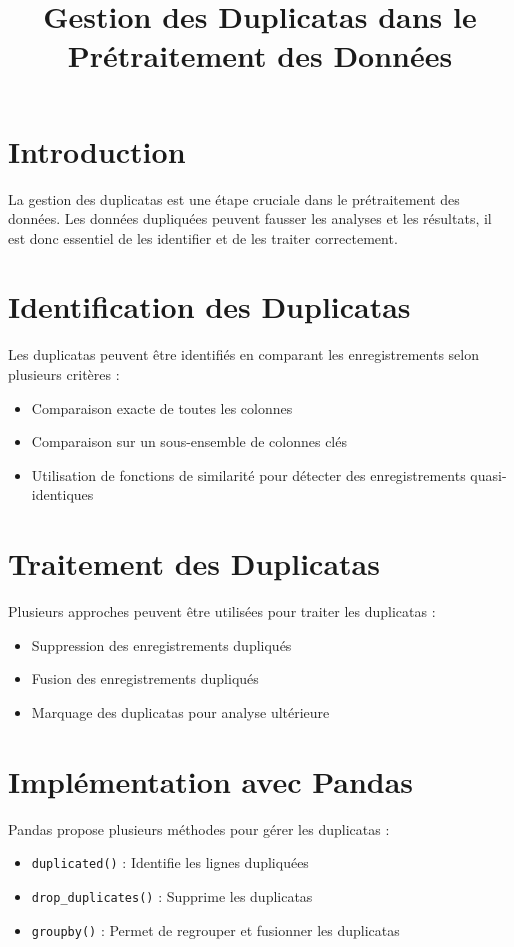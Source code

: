 \documentclass{article}
\title{Gestion des Duplicatas dans le Prétraitement des Données}
\author{}
\date{}
\begin{document}
\maketitle

\section{Introduction}
La gestion des duplicatas est une étape cruciale dans le prétraitement des données. Les données dupliquées peuvent fausser les analyses et les résultats, il est donc essentiel de les identifier et de les traiter correctement.

\section{Identification des Duplicatas}
Les duplicatas peuvent être identifiés en comparant les enregistrements selon plusieurs critères :
\begin{itemize}
    \item Comparaison exacte de toutes les colonnes
    \item Comparaison sur un sous-ensemble de colonnes clés
    \item Utilisation de fonctions de similarité pour détecter des enregistrements quasi-identiques
\end{itemize}

\section{Traitement des Duplicatas}
Plusieurs approches peuvent être utilisées pour traiter les duplicatas :
\begin{itemize}
    \item Suppression des enregistrements dupliqués
    \item Fusion des enregistrements dupliqués
    \item Marquage des duplicatas pour analyse ultérieure
\end{itemize}

\section{Implémentation avec Pandas}
Pandas propose plusieurs méthodes pour gérer les duplicatas \cite{pandas_duplicates,pandas_drop_duplicates} :
\begin{itemize}
    \item \texttt{duplicated()} : Identifie les lignes dupliquées
    \item \texttt{drop\_duplicates()} : Supprime les duplicatas
    \item \texttt{groupby()} : Permet de regrouper et fusionner les duplicatas
\end{itemize}
\end{document}
